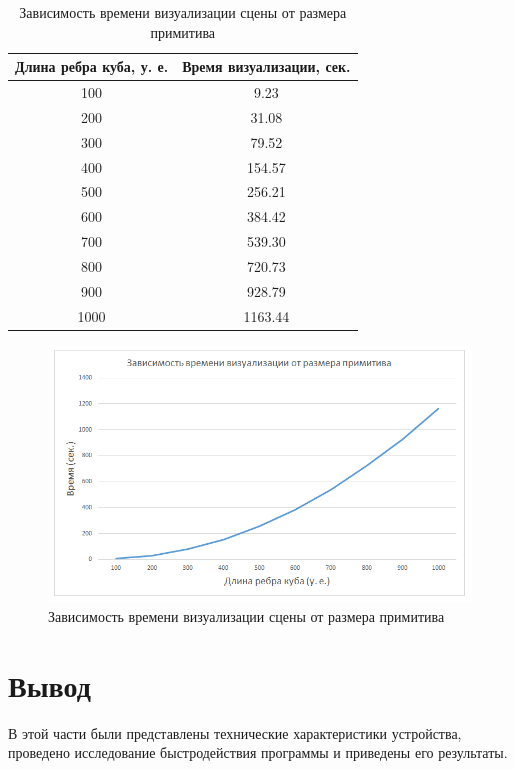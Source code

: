 \clearpage

\begin{table}[h]
	\small
	\centering
	\caption{Зависимость времени визуализации сцены от размера примитива}
	\begin{tabular}{|c|c|}
		\hline
		\textbf{Длина ребра куба, у. е.} & \textbf{Время визуализации, сек.} \\
		\hline
		100  & 9.23 \\
		200  & 31.08 \\
		300  & 79.52 \\
		400  & 154.57 \\
		500  & 256.21 \\
		600  & 384.42 \\
		700  & 539.30 \\
		800  & 720.73 \\
		900  & 928.79 \\
		1000 & 1163.44 \\
		\hline
	\end{tabular}
	\label{tbl:research3}
\end{table}

\begin{figure}[h] 
	\centering
	\includegraphics[width=1\textwidth]{images/research3.png}
	\caption{Зависимость времени визуализации сцены от размера примитива} 
	\label{fig:research3} 
\end{figure}

\section{Вывод}

В этой части были представлены технические характеристики устройства,
проведено исследование быстродействия программы и приведены его результаты.

\clearpage
